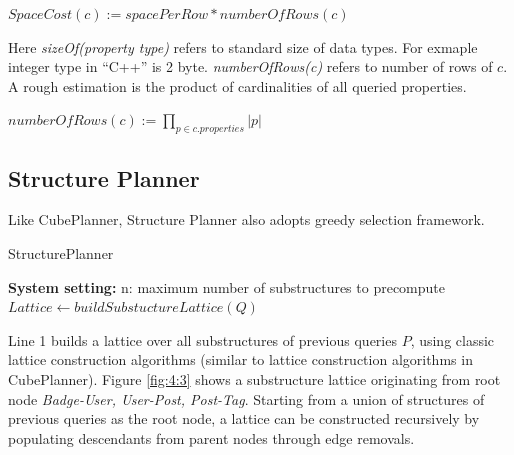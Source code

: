 $SpaceCost(c):= spacePerRow *  numberOfRows(c)$

Here \textit{sizeOf(property type)} refers to standard size of data types. For exmaple integer type in ``C++'' is 2 byte. \textit{numberOfRows(c)} refers to number of rows of $c$. A rough estimation is the product of cardinalities of all queried properties. 

$numberOfRows(c):= \displaystyle{\prod_{p\in c.properties}|p|} $


\subsection{Structure Planner}
\label{Structure Planner}
Like CubePlanner, Structure Planner also adopts greedy selection framework.

\begin{algorithm}[H]
\caption{StructurePlanner}
\LinesNumbered 
\textbf{System setting:} n: maximum number of substructures to precompute\\ 
$Lattice \leftarrow buildSubstuctureLattice(Q)$\;

\end{algorithm}
\clearpage

Line 1 builds a lattice over all substructures of previous queries $P$, using classic lattice construction algorithms (similar to lattice construction algorithms in CubePlanner). Figure \ref{fig:4:3} shows a substructure lattice originating from root node \textit{Badge-User, User-Post, Post-Tag}. Starting from a union of structures of previous queries as the root node, a lattice can be constructed recursively by populating descendants from parent nodes through edge removals.


